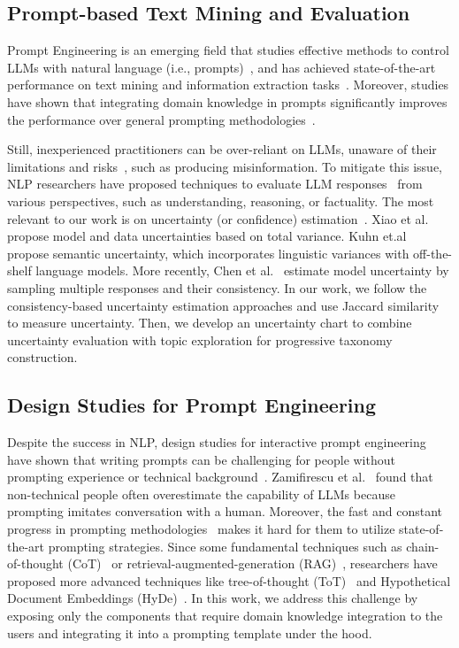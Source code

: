 \vspace*{-0.15cm}
\subsection{Prompt-based Text Mining and Evaluation}
Prompt Engineering is an emerging field that studies effective methods to control LLMs with natural language (i.e., prompts)~\cite{liu2023promptsurvey}, and has achieved state-of-the-art performance on text mining and information extraction tasks~\cite{dagdelen2024structured, xu2024llmforie}.
Moreover, studies have shown that integrating domain knowledge in prompts significantly improves the performance over general prompting methodologies~\cite{liu2025chemitryprompt}. 

Still, inexperienced practitioners can be over-reliant on LLMs, unaware of their limitations and risks~\cite{weidinger2022llmrisk}, such as producing misinformation. To mitigate this issue, NLP researchers have proposed techniques to evaluate LLM responses~\cite{chang2024surveyllm} from various perspectives, such as understanding, reasoning, or factuality. The most relevant to our work is on uncertainty (or confidence) estimation~\cite{chen2024quantifyinguncertaitny, Xiao2019quantify, kuhn2023semanticuncertainty}.
Xiao et al.~\cite{Xiao2019quantify} propose model and data uncertainties based on total variance. Kuhn et.al~\cite{kuhn2023semanticuncertainty} propose semantic uncertainty, which incorporates linguistic variances with off-the-shelf language models. More recently, Chen et al.~\cite{chen2024quantifyinguncertaitny} estimate model uncertainty by sampling multiple responses and their consistency.
In our work, we follow the consistency-based uncertainty estimation approaches and use Jaccard similarity to measure uncertainty. 
Then, we develop an uncertainty chart to combine uncertainty evaluation with topic exploration for progressive taxonomy construction.

\subsection{Design Studies for Prompt Engineering}
Despite the success in NLP, design studies for interactive prompt engineering have shown that writing prompts can be challenging for people without prompting experience or technical background~\cite{zamfirescu2023johnny, kim2024evallm}.
Zamifirescu et al.~\cite{zamfirescu2023johnny} found that non-technical people often overestimate the capability of LLMs because prompting imitates conversation with a human.
Moreover, the fast and constant progress in prompting methodologies~\cite{promptengineeringuide} makes it hard for them to utilize state-of-the-art prompting strategies.
Since some fundamental techniques such as chain-of-thought (CoT)~\cite{wei2023chainofthought} or retrieval-augmented-generation (RAG)~\cite{lewis2021rag}, researchers have proposed more advanced techniques like tree-of-thought (ToT)~\cite{yao2023treeofthought} and Hypothetical Document Embeddings (HyDe)~\cite{gao2022hyde}. 
In this work,  we address this challenge by exposing only the components that require domain knowledge integration to the users and integrating it into a prompting template under the hood.

